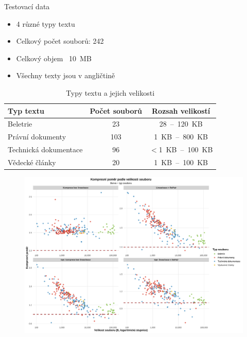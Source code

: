 \documentclass[lualatex,hyperref={pdfencoding=auto}]{beamer}
\begin{document}
\begin{frame}{Testovací data}
      \begin{itemize}
        \item 4 různé typy textu
        \item Celkový počet souborů: 242
        \item Celkový objem ~10~MB
        \item Všechny texty jsou v angličtině
      \end{itemize}
      \vspace{12pt}
    \begin{table}[ht]
      \centering
      \begin{tabular}{|l|c|c|}
        \hline
        \textbf{Typ textu} & \textbf{Počet souborů} & \textbf{Rozsah velikostí} \\
        \hline
        Beletrie & 23 & 28~--~120~KB \\
        Právní dokumenty & 103 & 1~KB~--~800~KB \\
        Technická dokumentace & 96 & $<$1~KB~--~100~KB \\
        Vědecké články & 20 & 1~KB~--~100~KB \\
        \hline
      \end{tabular}
      \caption{Typy textu a jejich velikosti}
    \end{table}
\end{frame}


\begin{frame}
  \begin{figure}
    \centering
    \includegraphics[width=\textwidth]{fig/compression_ratio_by_size_per_method.pdf}
    \label{fig:compression_ratio_by_size_per_method}
  \end{figure}
\end{frame}
\end{document}
